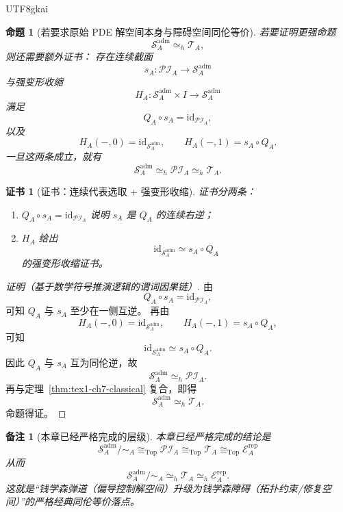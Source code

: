 \documentclass[12pt]{article}
\newtheorem{proposition}{命题}[section]
\newtheorem{remark}{备注}[section]
\newtheorem{Certificate}{证书}[section]
\begin{document}
\begin{CJK*}{UTF8}{gkai}
\begin{proposition}[若要求原始 PDE 解空间本身与障碍空间同伦等价]
\label{prop:tex1-ch7-strong}
若要证明更强命题
\[
  \mathcal S_A^{\mathrm{adm}}
  \simeq_h
  \mathcal T_A,
\]
则还需要额外证书：
存在连续截面
\[
  s_A:\mathcal{PI}_A\to \mathcal S_A^{\mathrm{adm}}
\]
与强变形收缩
\[
  H_A:\mathcal S_A^{\mathrm{adm}}\times I\to \mathcal S_A^{\mathrm{adm}}
\]
满足
\[
  Q_A\circ s_A=\mathrm{id}_{\mathcal{PI}_A},
\]
以及
\[
  H_A(-,0)=\mathrm{id}_{\mathcal S_A^{\mathrm{adm}}},
  \qquad
  H_A(-,1)=s_A\circ Q_A.
\]
一旦这两条成立，就有
\[
  \mathcal S_A^{\mathrm{adm}}
  \simeq_h
  \mathcal{PI}_A
  \simeq_h
  \mathcal T_A.
\]
\end{proposition}

\begin{Certificate}[证书：连续代表选取 + 强变形收缩]
\label{cert:tex1-ch7-strong}
证书分两条：
\begin{enumerate}
  \item \(Q_A\circ s_A=\mathrm{id}_{\mathcal{PI}_A}\) 说明 \(s_A\) 是 \(Q_A\) 的连续右逆；
  \item \(H_A\) 给出
  \[
    \mathrm{id}_{\mathcal S_A^{\mathrm{adm}}}
    \simeq
    s_A\circ Q_A
  \]
  的强变形收缩证书。
\end{enumerate}
\end{Certificate}

\begin{proof}[证明（基于数学符号推演逻辑的谓词因果链）]
由
\[
  Q_A\circ s_A=\mathrm{id}_{\mathcal{PI}_A},
\]
可知 \(Q_A\) 与 \(s_A\) 至少在一侧互逆。
再由
\[
  H_A(-,0)=\mathrm{id}_{\mathcal S_A^{\mathrm{adm}}},
  \qquad
  H_A(-,1)=s_A\circ Q_A,
\]
可知
\[
  \mathrm{id}_{\mathcal S_A^{\mathrm{adm}}}
  \simeq
  s_A\circ Q_A.
\]
因此 \(Q_A\) 与 \(s_A\) 互为同伦逆，故
\[
  \mathcal S_A^{\mathrm{adm}}
  \simeq_h
  \mathcal{PI}_A.
\]
再与定理~\ref{thm:tex1-ch7-classical} 复合，即得
\[
  \mathcal S_A^{\mathrm{adm}}
  \simeq_h
  \mathcal T_A.
\]
命题得证。
\end{proof}

\begin{remark}[本章已经严格完成的层级]
本章已经严格完成的结论是
\[
  \boxed{
    \mathcal S_A^{\mathrm{adm}}/\sim_A
    \cong_{\mathrm{Top}}
    \mathcal{PI}_A
    \cong_{\mathrm{Top}}
    \mathcal T_A
    \cong_{\mathrm{Top}}
    \mathcal E_A^{\mathrm{rep}}
  }
\]
从而
\[
  \boxed{
    \mathcal S_A^{\mathrm{adm}}/\sim_A
    \simeq_h
    \mathcal T_A
    \simeq_h
    \mathcal E_A^{\mathrm{rep}}.
  }
\]
这就是“钱学森弹道（偏导控制解空间）升级为钱学森障碍（拓扑约束/修复空间）”的严格经典同伦等价落点。
\end{remark}


\end{CJK*}
\end{document}
